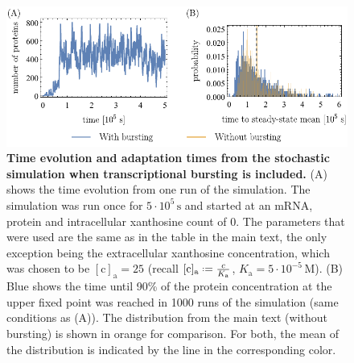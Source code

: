 \documentclass[10pt,letterpaper]{article}
\newcommand{\unit}[1]{\,\mathrm{#1}}
\newcommand{\n}[1]{\mathrm{#1}}
\newcommand*{\defeq}{\mathrel{\vcenter{\baselineskip0.5ex \lineskiplimit0pt
			\hbox{\scriptsize.}\hbox{\scriptsize.}}}%
	=}
\begin{document}
\begin{figure}
	\centering
	\includegraphics[width=1\textwidth]{FigSI6_7.pdf}
	\caption{{\bf Time evolution and adaptation times from the stochastic simulation when transcriptional bursting is included.}
		(A) shows the time evolution from one run of the simulation. The simulation was run once for $5 \cdot 10^5 \unit{s}$ and started
		at an mRNA, protein and intracellular xanthosine count of 0. The parameters that were used are the same as in the
		table in the main text, the only exception being the
		extracellular xanthosine concentration, which was chosen to be
		$\n{[c]_a} = 25$ (recall $\n{[c]_{a}} \defeq \frac{c}{K_{\n{a}}}$,
		$K_{\n{a}} = 5 \cdot 10^{-5} \unit{M}$).
		(B) Blue shows the time until 90\% of the protein concentration
		at the upper fixed point was reached in 1000 runs of the
		simulation (same conditions as (A)). The distribution from the
		main text (without bursting) is shown in orange for comparison.
		For both, the mean of the distribution is indicated by the line
		in the corresponding color.
		}
	\label{evolbursts}
\end{figure}
\end{document}
